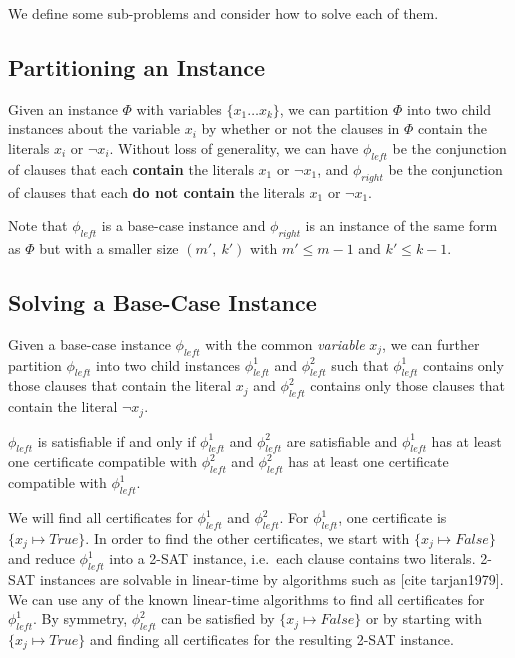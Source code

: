 We define some sub-problems and consider how to solve each of them.


\subsection*{Partitioning an Instance}

Given an instance $\Phi$ with variables $\{ x_1 \dots x_k \}$, we can partition $\Phi$ into two child instances about the variable $x_i$ by whether or not the clauses in $\Phi$ contain the literals $x_i$ or $\lnot x_i$.
Without loss of generality, we can have $\phi_{left}$ be the conjunction of clauses that each \textbf{contain} the literals $x_1$ or $\lnot x_1$, and $\phi_{right}$ be the conjunction of clauses that each \textbf{do not contain} the literals $x_1$ or $\lnot x_1$.

Note that $\phi_{left}$ is a base-case instance and $\phi_{right}$ is an instance of the same form as $\Phi$ but with a smaller size $(m',~ k')$ with $m' \leq m - 1$ and $k' \leq k - 1$.


\subsection*{Solving a Base-Case Instance}

Given a base-case instance $\phi_{left}$ with the common \textit{variable} $x_j$, we can further partition $\phi_{left}$ into two child instances $\phi_{left}^1$ and $\phi_{left}^2$ such that $\phi_{left}^1$ contains only those clauses that contain the literal $x_j$ and $\phi_{left}^2$ contains only those clauses that contain the literal $\lnot x_j$.

$\phi_{left}$ is satisfiable if and only if $\phi_{left}^1$ and $\phi_{left}^2$ are satisfiable and $\phi_{left}^1$ has at least one certificate compatible with $\phi_{left}^2$ and $\phi_{left}^2$ has at least one certificate compatible with $\phi_{left}^1$.

We will find all certificates for $\phi_{left}^1$ and $\phi_{left}^2$.
For $\phi_{left}^1$, one certificate is $\{ x_j \mapsto True \}$.
In order to find the other certificates, we start with $\{ x_j \mapsto False \}$ and reduce $\phi_{left}^1$ into a 2-SAT instance, i.e.\ each clause contains two literals.
2-SAT instances are solvable in linear-time by algorithms such as [cite tarjan1979].
We can use any of the known linear-time algorithms to find all certificates for $\phi_{left}^1$.
By symmetry, $\phi_{left}^2$ can be satisfied by $\{ x_j \mapsto False \}$ or by starting with $\{ x_j \mapsto True \}$ and finding all certificates for the resulting 2-SAT instance.


